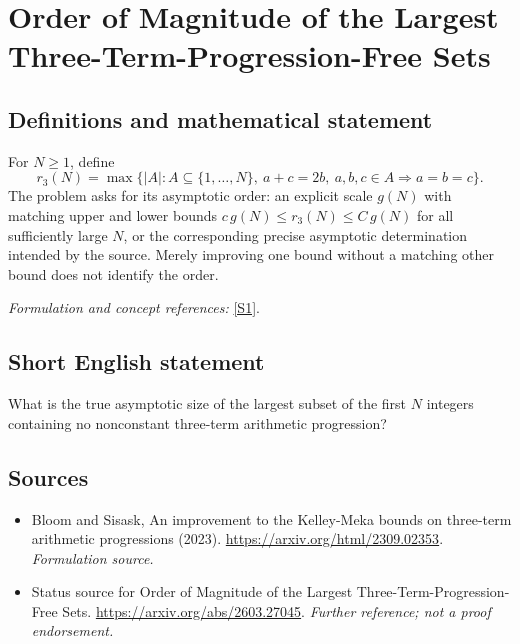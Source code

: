 \documentclass[11pt]{article}
\begin{document}
\section*{\texorpdfstring{Order of Magnitude of the Largest Three-Term-Progression-Free Sets}{Order of Magnitude of the Largest Three-Term-Progression-Free Sets}}\label{statement}
\subsection{Definitions and mathematical statement}
For $N\ge1$, define
\[
 r_3(N)=\max\{|A|:A\subseteq\{1,\ldots,N\},\
 a+c=2b,\ a,b,c\in A\Rightarrow a=b=c\}.
\]
The problem asks for its asymptotic order: an explicit scale $g(N)$ with matching upper and lower bounds $c\,g(N)\le r_3(N)\le C\,g(N)$ for all sufficiently large $N$, or the corresponding precise asymptotic determination intended by the source. Merely improving one bound without a matching other bound does not identify the order.
\par\smallskip\textit{Formulation and concept references:} \href{https://arxiv.org/html/2309.02353}{[S1]}.

\subsection{Short English statement}
What is the true asymptotic size of the largest subset of the first $N$ integers containing no nonconstant three-term arithmetic progression?
\subsection{Sources}
\begin{itemize}
\item[S1]Bloom and Sisask, An improvement to the Kelley-Meka bounds on three-term arithmetic progressions (2023).
\url{https://arxiv.org/html/2309.02353}.
\textit{Formulation source.}
\item[S2]Status source for Order of Magnitude of the Largest Three-Term-Progression-Free Sets.
\url{https://arxiv.org/abs/2603.27045}.
\textit{Further reference; not a proof endorsement.}
\end{itemize}
\end{document}
